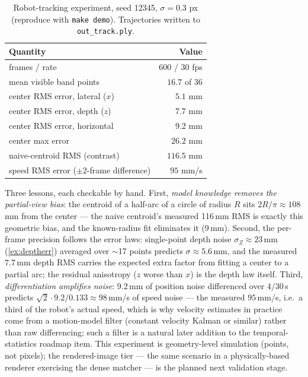 \documentclass[11pt]{article}
\theoremstyle{definition}
\newcommand{\code}[1]{\texttt{#1}}
\begin{document}
\begin{table}[ht]
\centering
\begin{tabular}{lr}
\toprule
Quantity & Value \\
\midrule
frames / rate                    & $600$ / $30$ fps \\
mean visible band points         & $16.7$ of $36$ \\
center RMS error, lateral ($x$)  & $5.1$ mm \\
center RMS error, depth ($z$)    & $7.7$ mm \\
center RMS error, horizontal     & $9.2$ mm \\
center max error                 & $26.2$ mm \\
naive-centroid RMS (contrast)    & $116.5$ mm \\
speed RMS error ($\pm2$-frame difference) & $95$ mm/s \\
\bottomrule
\end{tabular}
\caption{Robot-tracking experiment, seed 12345, $\sigma=0.3$ px
(reproduce with \code{make demo}). Trajectories written to
\code{out\_track.ply}.}
\label{tab:trackresults}
\end{table}

Three lessons, each checkable by hand. First, \emph{model knowledge
removes the partial-view bias}: the centroid of a half-arc of a circle of
radius $R$ sits $2R/\pi\approx108$\,mm from the center --- the naive
centroid's measured 116\,mm RMS is exactly this geometric bias, and the
known-radius fit eliminates it (9\,mm). Second, the per-frame precision
follows the error laws: single-point depth noise
$\sigma_Z\approx23$\,mm (\autoref{ex:deptherr}) averaged over
$\sim$17 points predicts $\sigma\approx5.6$\,mm, and the measured
$7.7$\,mm depth RMS carries the expected extra factor from fitting a
center to a partial arc; the residual anisotropy ($z$ worse than $x$) is
the depth law itself. Third, \emph{differentiation amplifies noise}:
$9.2$\,mm of position noise differenced over $4/30$\,s predicts
$\sqrt2\cdot9.2/0.133\approx98$\,mm/s of speed noise --- the measured
$95$\,mm/s, i.e.\ a third of the robot's actual speed, which is why
velocity estimates in practice come from a motion-model filter (constant
velocity Kalman or similar) rather than raw differencing; such a filter is
a natural later addition to the temporal-statistics roadmap item. This
experiment is geometry-level simulation (points, not pixels); the
rendered-image tier --- the same scenario in a physically-based renderer
exercising the dense matcher --- is the planned next validation stage.
\end{document}

